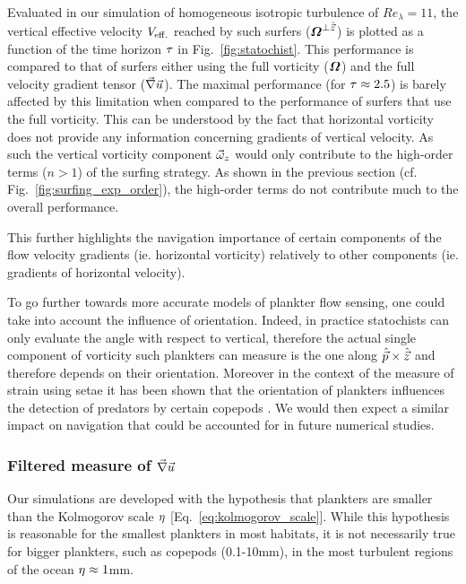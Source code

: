 Evaluated in our simulation of homogeneous isotropic turbulence of $\mathit{Re}_{\lambda} = 11$, the vertical effective velocity $V_{\mathrm{eff.}}$ reached by such surfers ($\boldsymbol{\varOmega}^{\bot \hat{\vec{z}}}$) is plotted as a function of the time horizon $\tau$ in Fig.~\ref{fig:statochist}.
This performance is compared to that of surfers either using the full vorticity ($\boldsymbol{\varOmega}$) and the full velocity gradient tensor ($\vec{\nabla} \vec{u}$).
The maximal performance (for $\tau \approx 2.5$) is barely affected by this limitation when compared to the performance of surfers that use the full vorticity.
This can be understood by the fact that horizontal vorticity does not provide any information concerning gradients of vertical velocity.
As such the vertical vorticity component $\vec{\omega}_z$ would only contribute to the high-order terms ($n > 1$) of the surfing strategy.
As shown in the previous section (cf. Fig.~\ref{fig:surfing_exp_order}), the high-order terms do not contribute much to the overall performance.

This further highlights the navigation importance of certain components of the flow velocity gradients (ie. horizontal vorticity) relatively to other components (ie. gradients of horizontal velocity).

To go further towards more accurate models of plankter flow sensing, one could take into account the influence of orientation.
Indeed, in practice statochists can only evaluate the angle with respect to vertical, therefore the actual single component of vorticity such plankters can measure is the one along $\hat{\vec{p}} \times \hat{\vec{z}}$ and therefore depends on their orientation.
Moreover in the context of the measure of strain using setae it has been shown that the orientation of plankters influences the detection of predators by certain copepods \citep{fields2010orientation}.
We would then expect a similar impact on navigation that could be accounted for in future numerical studies.

\subsubsection{Filtered measure of $\vec{\nabla} \vec{u}$}\label{sec:rob_filtered_measure}

Our simulations are developed with the hypothesis that plankters are smaller than the Kolmogorov scale $\eta$ [Eq.~\ref{eq:kolmogorov_scale}].
While this hypothesis is reasonable for the smallest plankters in most habitats, it is not necessarily true for bigger plankters, such as copepods (0.1-10mm), in the most turbulent regions of the ocean $\eta \approx 1$mm.

